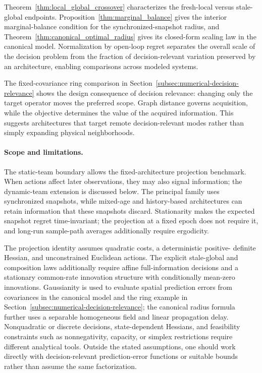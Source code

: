 \documentclass[11pt]{article}
\begin{document}
Theorem~\ref{thm:local_global_crossover} characterizes the fresh-local versus
stale-global endpoints. Proposition~\ref{thm:marginal_balance} gives the
interior marginal-balance condition for the synchronized-snapshot radius, and
Theorem~\ref{thm:canonical_optimal_radius} gives its closed-form scaling law in
the canonical model. Normalization by open-loop regret separates the overall
scale of the decision problem from the fraction of decision-relevant variation
preserved by an architecture, enabling comparisons across modeled systems.

The fixed-covariance ring comparison in Section~\ref{subsec:numerical-decision-relevance}
shows the design consequence of decision relevance: changing only the target
operator moves the preferred scope. Graph distance governs acquisition, while
the objective determines the value of the acquired information. This suggests
architectures that target remote decision-relevant modes rather than simply
expanding physical neighborhoods.

\paragraph{Scope and limitations.}
The static-team boundary allows the fixed-architecture projection benchmark.
When actions affect later observations, they may also signal information;
the dynamic-team extension is discussed below. The principal family uses
synchronized snapshots, while mixed-age and history-based architectures can
retain information that these snapshots discard. Stationarity makes the
expected snapshot regret time-invariant; the projection at a fixed epoch does
not require it, and long-run sample-path averages additionally require ergodicity.

The projection identity assumes quadratic costs, a deterministic positive-
definite Hessian, and unconstrained Euclidean actions. The explicit stale-global
and composition laws additionally require affine full-information decisions
and a stationary common-rate innovation structure with conditionally
mean-zero innovations. Gaussianity is used to evaluate spatial prediction
errors from covariances in the canonical model and the ring example in
Section~\ref{subsec:numerical-decision-relevance};
the canonical radius formula further uses a separable homogeneous field
and linear propagation delay.
Nonquadratic or discrete decisions, state-dependent Hessians, and feasibility
constraints such as nonnegativity, capacity, or simplex restrictions require
different analytical tools. Outside the stated assumptions, one should work
directly with decision-relevant prediction-error functions or suitable bounds
rather than assume the same factorization.
\end{document}
